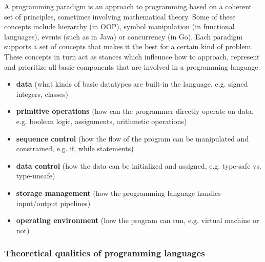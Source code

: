 \documentclass{article}
\begin{document}
A programming paradigm is an approach to programming based on a coherent set of principles, sometimes involving mathematical theory. Some of these concepts include hierarchy (in OOP), symbol manipulation (in functional languages), events (such as in Java) or concurrency (in Go). Each paradigm supports a set of concepts that makes it the best for a certain kind of problem\cite{van_roy_programming_2012}. These concepts in turn act as stances which infleunce how to approach, represent and prioritize all basic components that are involved in a programming language:

\begin{itemize}
  \item \textbf{data} (what kinds of basic datatypes are built-in the language, e.g. signed integers, classes)
  \item \textbf{primitive operations} (how can the programmer directly operate on data, e.g. boolean logic, assignments, arithmetic operations)
  \item \textbf{sequence control} (how the flow of the program can be manipulated and constrained, e.g. if, while statements)
  \item \textbf{data control} (how the data can be initialized and assigned, e.g. type-safe vs. type-unsafe)
  \item \textbf{storage management} (how the programming language handles input/output pipelines)
  \item \textbf{operating environment} (how the program can run, e.g. virtual machine or not)
\end{itemize}

\subsubsection{Theoretical qualities of programming languages}
\end{document}
